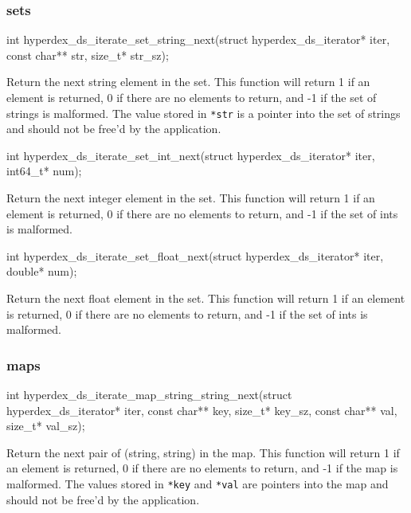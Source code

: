 \subsubsection{sets}

\begin{ccode}
int hyperdex_ds_iterate_set_string_next(struct hyperdex_ds_iterator* iter,
                                        const char** str, size_t* str_sz);
\end{ccode}
\funcdesc Return the next string element in the set.  This function will return
1 if an element is returned, 0 if there are no elements to return, and -1 if the
set of strings is malformed.  The value stored in \texttt{*str} is a pointer
into the set of strings and should not be free'd by the application.

\funcsep
\begin{ccode}
int hyperdex_ds_iterate_set_int_next(struct hyperdex_ds_iterator* iter, int64_t* num);
\end{ccode}
\funcdesc Return the next integer element in the set.  This function will return
1 if an element is returned, 0 if there are no elements to return, and -1 if the
set of ints is malformed.

\funcsep
\begin{ccode}
int hyperdex_ds_iterate_set_float_next(struct hyperdex_ds_iterator* iter, double* num);
\end{ccode}
\funcdesc Return the next float element in the set.  This function will return 1
if an element is returned, 0 if there are no elements to return, and -1 if the
set of ints is malformed.

\subsubsection{maps}

\begin{ccode}
int hyperdex_ds_iterate_map_string_string_next(struct hyperdex_ds_iterator* iter,
                                               const char** key, size_t* key_sz,
                                               const char** val, size_t* val_sz);
\end{ccode}
\funcdesc Return the next pair of (string, string) in the map.  This function
will return 1 if an element is returned, 0 if there are no elements to return,
and -1 if the map is malformed.  The values stored in \texttt{*key} and
\texttt{*val} are pointers into the map and should not be free'd by the
application.

